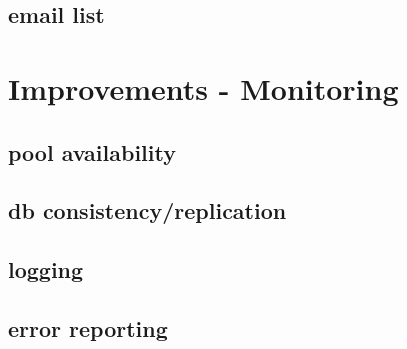 \documentclass{beamer}
\begin{document}
\subsection{email list}
\begin{frame}
\end{frame}

\section{Improvements - Monitoring}
\subsection{pool availability}
\begin{frame}
\end{frame}

\subsection{db consistency/replication}
\begin{frame}
\end{frame}

\subsection{logging}
\begin{frame}
\end{frame}

\subsection{error reporting}
\begin{frame}
\end{frame}
\end{document}
